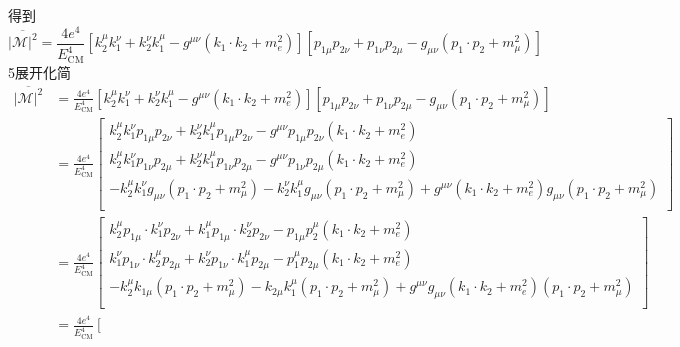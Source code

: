 得到
\begin{equation}
    \overline{\left| \mathcal{M} \right|^2}=\frac{4e^4}{E_{\mathrm{CM}}^{4}}\left[ k_{2}^{\mu}k_{1}^{\nu}+k_{2}^{\nu}k_{1}^{\mu}-g^{\mu \nu}\left( k_1\cdot k_2+m_{e}^{2} \right) \right] \left[ p_{1\mu}p_{2\nu}+p_{1\nu}p_{2\mu}-g_{\mu \nu}\left( p_1\cdot p_2+m_{\mu}^{2} \right) \right] 
\end{equation}
5展开化简
\begin{equation}
    \begin{aligned}
        \overline{\left| \mathcal{M} \right|^2}&=\frac{4e^4}{E_{\mathrm{CM}}^{4}}\left[ k_{2}^{\mu}k_{1}^{\nu}+k_{2}^{\nu}k_{1}^{\mu}-g^{\mu \nu}\left( k_1\cdot k_2+m_{e}^{2} \right) \right] \left[ p_{1\mu}p_{2\nu}+p_{1\nu}p_{2\mu}-g_{\mu \nu}\left( p_1\cdot p_2+m_{\mu}^{2} \right) \right] 
\\
&=\frac{4e^4}{E_{\mathrm{CM}}^{4}}\left[ \begin{array}{c}
	k_{2}^{\mu}k_{1}^{\nu}p_{1\mu}p_{2\nu}+k_{2}^{\nu}k_{1}^{\mu}p_{1\mu}p_{2\nu}-g^{\mu \nu}p_{1\mu}p_{2\nu}\left( k_1\cdot k_2+m_{e}^{2} \right)\\
	k_{2}^{\mu}k_{1}^{\nu}p_{1\nu}p_{2\mu}+k_{2}^{\nu}k_{1}^{\mu}p_{1\nu}p_{2\mu}-g^{\mu \nu}p_{1\nu}p_{2\mu}\left( k_1\cdot k_2+m_{e}^{2} \right)\\
	-k_{2}^{\mu}k_{1}^{\nu}g_{\mu \nu}\left( p_1\cdot p_2+m_{\mu}^{2} \right) -k_{2}^{\nu}k_{1}^{\mu}g_{\mu \nu}\left( p_1\cdot p_2+m_{\mu}^{2} \right) +g^{\mu \nu}\left( k_1\cdot k_2+m_{e}^{2} \right) g_{\mu \nu}\left( p_1\cdot p_2+m_{\mu}^{2} \right)\\
\end{array} \right] 
\\
&=\frac{4e^4}{E_{\mathrm{CM}}^{4}}\left[ \begin{array}{c}
	k_{2}^{\mu}p_{1\mu}\cdot k_{1}^{\nu}p_{2\nu}+k_{1}^{\mu}p_{1\mu}\cdot k_{2}^{\nu}p_{2\nu}-p_{1\mu}p_{2}^{\mu}\left( k_1\cdot k_2+m_{e}^{2} \right)\\
	k_{1}^{\nu}p_{1\nu}\cdot k_{2}^{\mu}p_{2\mu}+k_{2}^{\nu}p_{1\nu}\cdot k_{1}^{\mu}p_{2\mu}-p_{1}^{\mu}p_{2\mu}\left( k_1\cdot k_2+m_{e}^{2} \right)\\
	-k_{2}^{\mu}k_{1\mu}\left( p_1\cdot p_2+m_{\mu}^{2} \right) -k_{2\mu}k_{1}^{\mu}\left( p_1\cdot p_2+m_{\mu}^{2} \right) +g^{\mu \nu}g_{\mu \nu}\left( k_1\cdot k_2+m_{e}^{2} \right) \left( p_1\cdot p_2+m_{\mu}^{2} \right)\\
\end{array} \right] 
\\
&=\frac{4e^4}{E_{\mathrm{CM}}^{4}}\left[ \begin{array}{c}

\end{array}
\end{aligned}
\end{equation}
